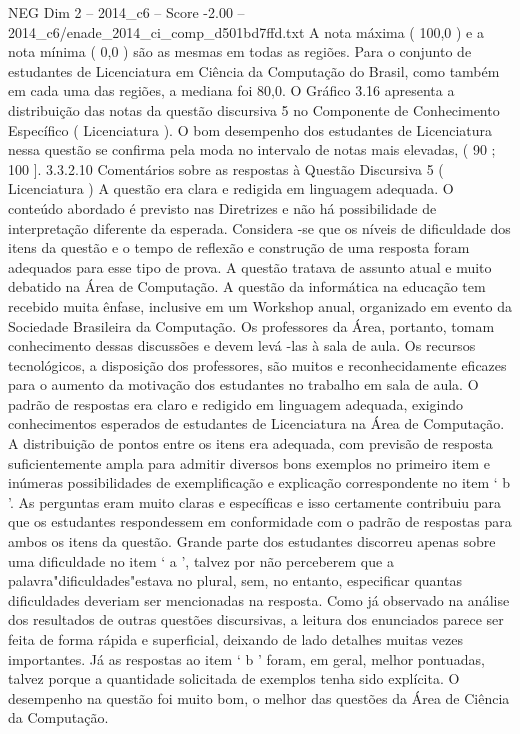 \begin{textsample}{NEG Dim 2 – 2014\_c6 – Score -2.00 – 2014\_c6/enade\_2014\_ci\_comp\_d501bd7ffd.txt}
A nota máxima ( 100,0 ) e a nota mínima ( 0,0 ) são as mesmas em todas as regiões.
Para o conjunto de estudantes de Licenciatura em Ciência da Computação do Brasil, como também em cada uma das regiões, a mediana foi 80,0.
O Gráfico 3.16 apresenta a distribuição das notas da questão discursiva 5 no Componente de Conhecimento Específico ( Licenciatura ).
O bom desempenho dos estudantes de Licenciatura nessa questão se confirma pela moda no intervalo de notas mais elevadas, ( 90 ; 100 ]. 3.3.2.10 Comentários sobre as respostas à Questão Discursiva 5 ( Licenciatura ) A questão era clara e redigida em linguagem adequada.
O conteúdo abordado é previsto nas Diretrizes e não há possibilidade de interpretação diferente da esperada.
Considera -se que os níveis de dificuldade dos itens da questão e o tempo de reflexão e construção de uma resposta foram adequados para esse tipo de prova.
A questão tratava de assunto atual e muito debatido na Área de Computação.
A questão da informática na educação tem recebido muita ênfase, inclusive em um Workshop anual, organizado em evento da Sociedade Brasileira da Computação.
Os professores da Área, portanto, tomam conhecimento dessas discussões e devem levá -las à sala de aula.
Os recursos tecnológicos, a disposição dos professores, são muitos e reconhecidamente eficazes para o aumento da motivação dos estudantes no trabalho em sala de aula.
O padrão de respostas era claro e redigido em linguagem adequada, exigindo conhecimentos esperados de estudantes de Licenciatura na Área de Computação.
A distribuição de pontos entre os itens era adequada, com previsão de resposta suficientemente ampla para admitir diversos bons exemplos no primeiro item e inúmeras possibilidades de exemplificação e explicação correspondente no item ‘ b ’.
As perguntas eram muito claras e específicas e isso certamente contribuiu para que os estudantes respondessem em conformidade com o padrão de respostas para ambos os itens da questão.
Grande parte dos estudantes discorreu apenas sobre uma dificuldade no item ‘ a ’, talvez por não perceberem que a palavra"dificuldades"estava no plural, sem, no entanto, especificar quantas dificuldades deveriam ser mencionadas na resposta.
Como já observado na análise dos resultados de outras questões discursivas, a leitura dos enunciados parece ser feita de forma rápida e superficial, deixando de lado detalhes muitas vezes importantes.
Já as respostas ao item ‘ b ’ foram, em geral, melhor pontuadas, talvez porque a quantidade solicitada de exemplos tenha sido explícita.
O desempenho na questão foi muito bom, o melhor das questões da Área de Ciência da Computação.

\end{textsample}
